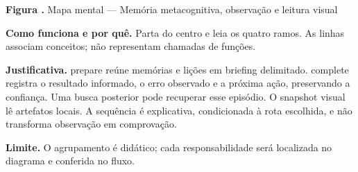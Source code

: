 {\small\textbf{Figura \thefigure.} Mapa mental --- Memória metacognitiva, observação e leitura visual}\par\smallskip
\noindent\textbf{Como funciona e por quê.} Parta do centro e leia os quatro ramos. As linhas associam conceitos; não representam chamadas de funções.\par
\noindent\textbf{Justificativa.} prepare reúne memórias e lições em briefing delimitado. complete registra o resultado informado, o erro observado e a próxima ação, preservando a confiança. Uma busca posterior pode recuperar esse episódio. O snapshot visual lê artefatos locais. A sequência é explicativa, condicionada à rota escolhida, e não transforma observação em comprovação.\par
\noindent\textbf{Limite.} O agrupamento é didático; cada responsabilidade será localizada no diagrama e conferida no fluxo.\par\smallskip
{}
